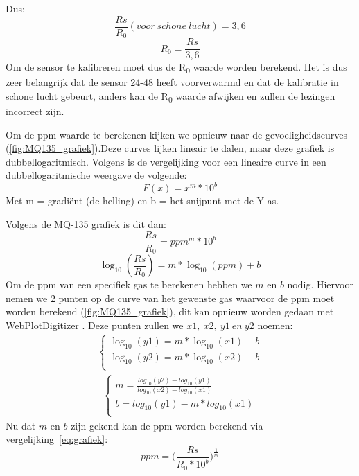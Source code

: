 Dus:
\begin{equation}
    \frac{Rs}{R_0}(voor\ schone\ lucht) = 3,6
\end{equation}
\begin{equation}
    R_0 = \frac{Rs}{3,6}
\end{equation}
Om de sensor te kalibreren moet dus de R\textsubscript{0} waarde worden berekend. Het is dus zeer belangrijk dat de sensor 24-48 heeft voorverwarmd en dat de kalibratie in schone lucht gebeurt, anders kan de R\textsubscript{0} waarde afwijken en zullen de lezingen incorrect zijn.

Om de ppm waarde te berekenen kijken we opnieuw naar de gevoeligheidscurves (\ref{fig:MQ135_grafiek}).Deze curves lijken lineair te dalen, maar deze grafiek is dubbellogaritmisch. Volgens 
is de vergelijking voor een lineaire curve in een dubbellogaritmische weergave de volgende:
\begin{equation}
    F(x) = x^{m} * 10^{b}
\end{equation}
Met m = gradiënt (de helling) en b = het snijpunt met de Y-as.

Volgens de MQ-135 grafiek is dit dan:
\begin{equation}
    \label{eq:grafiek}
    \frac{Rs}{R_0} = ppm^{m} * 10^{b}
\end{equation}
\begin{equation}
    \log_{10} (\frac{Rs}{R_0}) = m * \log_{10} (ppm) + b
\end{equation}
Om de ppm van een specifiek gas te berekenen hebben we $m$ en $b$ nodig. Hiervoor nemen we 2 punten op de curve van het gewenste gas waarvoor de ppm moet worden berekend (\ref{fig:MQ135_grafiek}), dit kan opnieuw worden gedaan met WebPlotDigitizer
. Deze punten zullen we $x1,\ x2,\ y1\ en\ y2$ noemen:
\begin{eqnarray}
    \begin{cases}
        \log_{10} (y1) = m * \log_{10} (x1) + b\\
        \log_{10} (y2) = m * \log_{10} (x2) + b\\
    \end{cases}
\end{eqnarray}
\begin{eqnarray}
    \begin{cases}
        m = \frac{log_{10} (y2) - log_{10} (y1)}{log_{10} (x2) - log_{10} (x1)} \\
        b = log_{10} (y1) - m * log_{10} (x1)\\
    \end{cases}
\end{eqnarray}
Nu dat $m$ en $b$ zijn gekend kan de ppm worden berekend via vergelijking~\ref{eq:grafiek}:
\begin{equation}
    ppm = \Big(\frac{Rs}{R_0 * 10^{b}}\Big)^{\frac{1}{m}}
\end{equation}

